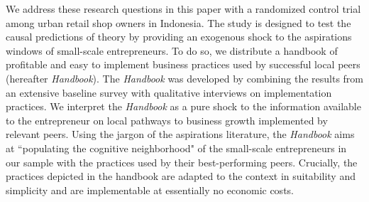\documentclass[11.5pt]{article}
\begin{document}

We address these research questions in this paper with a randomized control trial among urban retail shop owners in Indonesia. The study is designed to test the causal predictions of theory by providing an exogenous shock to the aspirations windows of small-scale entrepreneurs. To do so, we distribute a handbook of profitable and easy to implement business practices used by successful local peers (hereafter \emph{Handbook}). The \emph{Handbook} was developed by combining the results from an extensive baseline survey with qualitative interviews on implementation practices. We interpret the \emph{Handbook} as a pure shock to the information available to the entrepreneur on local pathways to business growth implemented by relevant peers. Using the jargon of the aspirations literature, the \emph{Handbook} aims at ``populating the cognitive neighborhood" of the small-scale entrepreneurs in our sample with the practices used by their best-performing peers. Crucially, the practices depicted in the handbook are adapted to the context in suitability and simplicity and are implementable at essentially no economic costs.
\end{document}
